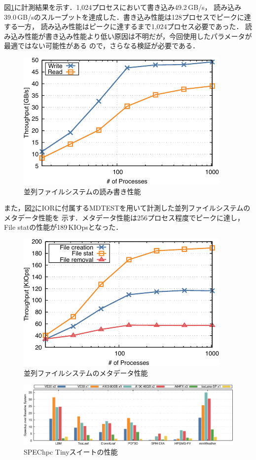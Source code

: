 ﻿\documentclass[submit,techrep,noauthor]{ipsj}
\begin{document}
図\ref{fig:ior}に計測結果を示す．1,024プロセスにおいて書き込み49.2\,GB/s，
読み込み39.0\,GB/sのスループットを達成した．書き込み性能は128プロセスでピークに達する一方，
読み込み性能はピークに達するまで1,024プロセス必要であった．
読み込み性能が書き込み性能より低い原因は不明だが，今回使用したパラメータが最適ではない可能性がある
ので，さらなる検証が必要である．

\begin{figure}[tb]
  \centering
  \includegraphics{figs/ior.pdf}
  \caption{並列ファイルシステムの読み書き性能}\label{fig:ior}
\end{figure}

また，図\ref{fig:mdtest}にIORに付属するMDTESTを用いて計測した並列ファイルシステムのメタデータ性能を
示す．メタデータ性能は256プロセス程度でピークに達し，File statの性能が189\,KIOpsとなった．

\begin{figure}[tb]
  \centering
  \includegraphics{figs/mdtest.pdf}
  \caption{並列ファイルシステムのメタデータ性能}\label{fig:mdtest}
\end{figure}

\begin{figure}[tb]
  \centering
  \includegraphics{figs/spechpc_tiny.pdf}
  \caption{SPEChpc Tinyスイートの性能~\cite{Takahashi2023}}\label{fig:spechpc-t}
\end{figure}
\end{document}
